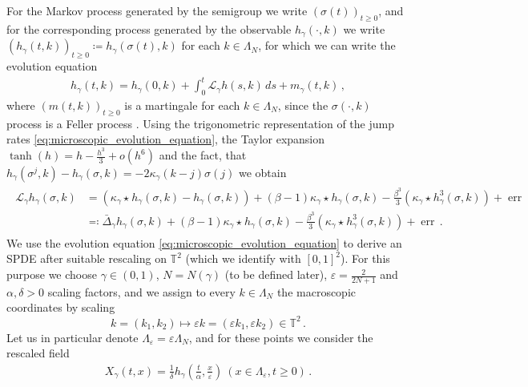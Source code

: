 \documentclass{report}
\newcommand{\TT}{\mathbb{T}}
\newcommand{\Convolve}[3][]{#2 \star_{#1} #3}
\DeclareMathOperator{\DefiningEquality}{\coloneqq}
\DeclareMathOperator{\DefiningEqualityRev}{\eqqcolon}
\theoremstyle{remark}
\theoremstyle{definition}
\let\epsilon\varepsilon
\begin{document}
For the Markov process generated by the semigroup we write $(\sigma(t))_{t \ge 0}$, and for the corresponding process generated by the observable $h_\gamma(\cdot, k)$ we write $(h_\gamma(t, k))_{t \ge 0} \DefiningEquality h_\gamma(\sigma(t), k)$ for each $k \in \Lambda_N$, for which we can write the evolution equation
\begin{align}
  \label{eq:microscopic_evolution_equation}
  h_\gamma(t, k) = h_\gamma(0, k) + \int_{0}^{t} \mathcal{L}_\gamma h(s, k) \,ds + m_\gamma(t, k)\,,
\end{align}
where $(m(t, k))_{t\ge 0}$ is a martingale for each $k\in \Lambda_N$\cite[Appendix B]{mourrat2015convergencetwodimensionaldynamicisingkac}, since the $\sigma(\cdot, k)$ process is a Feller process \cite[Section 6.5.1]{gall2016brownian}. Using the trigonometric representation of the jump rates \eqref{eq:microscopic_evolution_equation}, the Taylor expansion $\tanh(h) = h - \frac{h^3}{3} + o(h^6)$ and the fact, that $h_\gamma(\sigma^j, k) - h_\gamma(\sigma, k) = -2 \kappa_\gamma(k-j) \sigma(j)$ we obtain 
\begin{align*}
  \begin{split}
    \mathcal{L}_\gamma h_\gamma(\sigma, k) &= \left(\Convolve{\kappa_\gamma}{h_\gamma(\sigma, k)} - h_\gamma(\sigma, k)\right) + (\beta - 1) \Convolve{\kappa_\gamma}{h_\gamma(\sigma, k)} - \frac{\beta^3}{3}\left(\Convolve{\kappa_\gamma}{h_\gamma^3(\sigma, k)}\right) + \operatorname{err}\\
  &\DefiningEqualityRev \bar{\Delta}_\gamma h_\gamma(\sigma, k) + (\beta - 1) \Convolve{\kappa_\gamma}{h_\gamma(\sigma, k)} - \frac{\beta^3}{3}\left(\Convolve{\kappa_\gamma}{h_\gamma^3(\sigma, k)}\right) + \operatorname{err}\,.
  \end{split}
\end{align*}
We use the evolution equation \eqref{eq:microscopic_evolution_equation} to derive an SPDE after suitable rescaling on $\TT^2$ (which we identify with $[0, 1]^2$). For this purpose we choose $\gamma \in (0, 1)$, $N = N(\gamma)$ (to be defined later), $\epsilon = \frac{2}{2N + 1}$ and $\alpha, \delta > 0$ scaling factors, and we assign to every $k \in \Lambda_N$ the macroscopic coordinates by scaling $$k = (k_1, k_2) \mapsto \epsilon k =(\epsilon k_1, \epsilon k_2) \in \TT^2\,.$$ Let us in particular denote $\Lambda_\epsilon = \epsilon \Lambda_N$, and for these points we consider the rescaled field
\begin{align}
  X_\gamma(t, x) = \frac{1}{\delta}h_\gamma\left(\frac{t}{\alpha}, \frac{x}{\epsilon}\right)~(x\in \Lambda_\epsilon, t \ge 0)\,.
\end{align}
\end{document}
